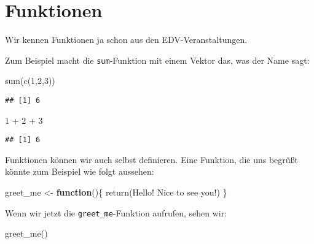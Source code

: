 \documentclass[
]{book}
\newenvironment{Shaded}{\begin{snugshade}}{\end{snugshade}}
\newcommand{\ControlFlowTok}[1]{\textcolor[rgb]{0.13,0.29,0.53}{\textbf{#1}}}
\newcommand{\DecValTok}[1]{\textcolor[rgb]{0.00,0.00,0.81}{#1}}
\newcommand{\FunctionTok}[1]{\textcolor[rgb]{0.00,0.00,0.00}{#1}}
\newcommand{\NormalTok}[1]{#1}
\newcommand{\OtherTok}[1]{\textcolor[rgb]{0.56,0.35,0.01}{#1}}
\newcommand{\SpecialCharTok}[1]{\textcolor[rgb]{0.00,0.00,0.00}{#1}}
\newcommand{\StringTok}[1]{\textcolor[rgb]{0.31,0.60,0.02}{#1}}
\begin{document}
\hypertarget{funktionen}{%
\section{Funktionen}\label{funktionen}}

Wir kennen Funktionen ja schon aus den EDV-Veranstaltungen.

Zum Beispiel macht die \texttt{sum}-Funktion mit einem Vektor das, was der Name sagt:

\begin{Shaded}
\begin{Highlighting}[]
\FunctionTok{sum}\NormalTok{(}\FunctionTok{c}\NormalTok{(}\DecValTok{1}\NormalTok{,}\DecValTok{2}\NormalTok{,}\DecValTok{3}\NormalTok{))}
\end{Highlighting}
\end{Shaded}

\begin{verbatim}
## [1] 6
\end{verbatim}

\begin{Shaded}
\begin{Highlighting}[]
\DecValTok{1} \SpecialCharTok{+} \DecValTok{2} \SpecialCharTok{+} \DecValTok{3}
\end{Highlighting}
\end{Shaded}

\begin{verbatim}
## [1] 6
\end{verbatim}

Funktionen können wir auch selbst definieren. Eine Funktion, die uns begrüßt könnte zum Beispiel wie folgt aussehen:

\begin{Shaded}
\begin{Highlighting}[]
\NormalTok{greet\_me }\OtherTok{\textless{}{-}} \ControlFlowTok{function}\NormalTok{()\{}
  \FunctionTok{return}\NormalTok{(}\StringTok{\textquotesingle{}Hello! Nice to see you!\textquotesingle{}}\NormalTok{)}
\NormalTok{\}}
\end{Highlighting}
\end{Shaded}

Wenn wir jetzt die \texttt{greet\_me}-Funktion aufrufen, sehen wir:

\begin{Shaded}
\begin{Highlighting}[]
\FunctionTok{greet\_me}\NormalTok{()}
\end{Highlighting}
\end{Shaded}
\end{document}

